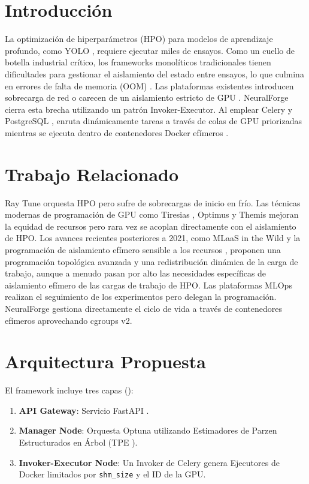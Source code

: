 \documentclass[conference]{IEEEtran}
\begin{document}
\section{Introducción}
La optimización de hiperparámetros (HPO) para modelos de aprendizaje profundo, como YOLO \cite{jocher2023yolov8}, requiere ejecutar miles de ensayos. Como un cuello de botella industrial crítico, los frameworks monolíticos tradicionales tienen dificultades para gestionar el aislamiento del estado entre ensayos, lo que culmina en errores de falta de memoria (OOM) \cite{steiner2023model}. Las plataformas existentes introducen sobrecarga de red o carecen de un aislamiento estricto de GPU \cite{liaw2018tune, burns2016borg}. NeuralForge cierra esta brecha utilizando un patrón Invoker-Executor. Al emplear Celery \cite{sobolev2015celery} y PostgreSQL \cite{momjian2001postgresql}, enruta dinámicamente tareas a través de colas de GPU priorizadas mientras se ejecuta dentro de contenedores Docker efímeros \cite{merkel2014docker}.

\section{Trabajo Relacionado}
Ray Tune \cite{liaw2018tune, moritz2018ray} orquesta HPO pero sufre de sobrecargas de inicio en frío. Las técnicas modernas de programación de GPU como Tiresias \cite{gu2019tiresias}, Optimus \cite{peng2020optimus} y Themis \cite{zhang2020themis} mejoran la equidad de recursos pero rara vez se acoplan directamente con el aislamiento de HPO. Los avances recientes posteriores a 2021, como MLaaS in the Wild \cite{weng2022mlaas} y la programación de aislamiento efímero sensible a los recursos \cite{zhang2022specon, flowcon2023}, proponen una programación topológica avanzada y una redistribución dinámica de la carga de trabajo, aunque a menudo pasan por alto las necesidades específicas de aislamiento efímero de las cargas de trabajo de HPO. Las plataformas MLOps realizan el seguimiento de los experimentos pero delegan la programación. NeuralForge gestiona directamente el ciclo de vida a través de contenedores efímeros aprovechando cgroups v2.

\section{Arquitectura Propuesta}
El framework incluye tres capas ():
\begin{enumerate}
    \item \textbf{API Gateway}: Servicio FastAPI \cite{fastapi2020}.
    \item \textbf{Manager Node}: Orquesta Optuna \cite{akiba2019optuna} utilizando Estimadores de Parzen Estructurados en Árbol (TPE \cite{bergstra2011tpe}).
    \item \textbf{Invoker-Executor Node}: Un Invoker de Celery genera Ejecutores de Docker limitados por \texttt{shm\_size} y el ID de la GPU.
\end{enumerate}
\end{document}

